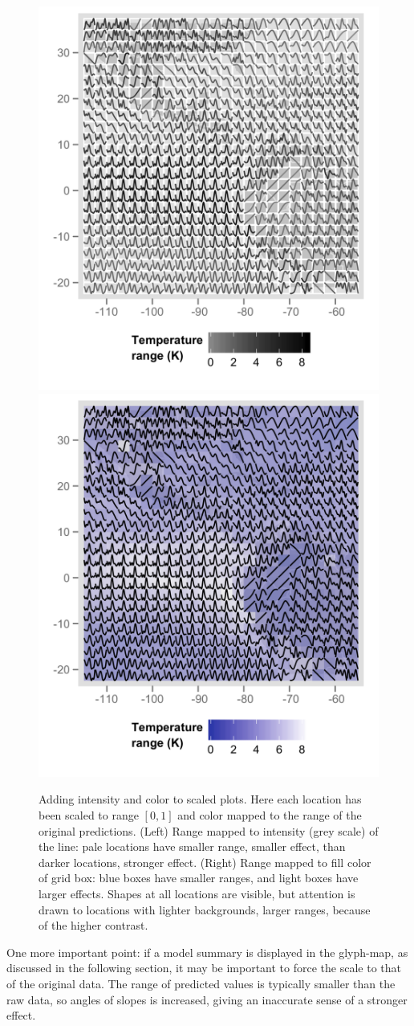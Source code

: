 \documentclass[oneside]{article}
\begin{document}
\begin{figure}[htbp]
 \centering
 \includegraphics[width=0.5\linewidth]{month-rescale01-col}%
 \includegraphics[width=0.5\linewidth]{month-rescale01-fill}
 \caption{Adding intensity and color to scaled plots. Here each location has been scaled to range $[0, 1]$ and color mapped to the range of the original predictions. (Left) Range mapped to intensity (grey scale) of the line: pale locations have smaller range, smaller effect, than darker locations, stronger effect. (Right) Range mapped to fill color of grid box: blue boxes have smaller ranges, and light boxes have larger effects. Shapes at all locations are visible, but attention is drawn to locations with lighter backgrounds, larger ranges, because of the higher contrast.}
 \label{fig:scaling-col}
\end{figure}

One more important point: if a model summary is displayed in the glyph-map, as discussed in the following section, it may be important to force the scale to that of the original data. The range of predicted values is typically smaller than the raw data, so angles of slopes is increased, giving an inaccurate sense of a stronger effect.  
\end{document}
